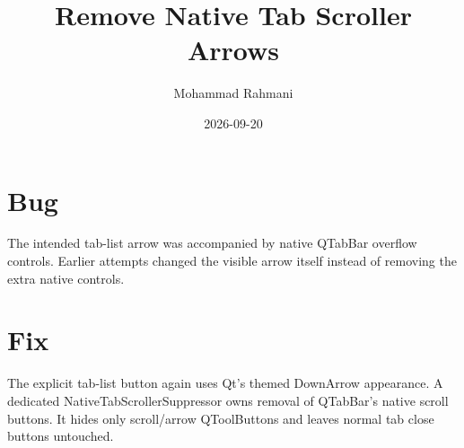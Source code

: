 \documentclass[a4paper]{article}
\title{Remove Native Tab Scroller Arrows}
\date{2026-09-20}
\author{Mohammad Rahmani}
\begin{document}
   \maketitle

   \begin{preview}
      \section{Bug}
      The intended tab-list arrow was accompanied by native QTabBar overflow
      controls.  Earlier attempts changed the visible arrow itself instead of
      removing the extra native controls.

      \section{Fix}
      The explicit tab-list button again uses Qt's themed DownArrow appearance.
      A dedicated NativeTabScrollerSuppressor owns removal of QTabBar's native
      scroll buttons.  It hides only scroll/arrow QToolButtons and leaves normal
      tab close buttons untouched.
   \end{preview}

   
   
\end{document}
